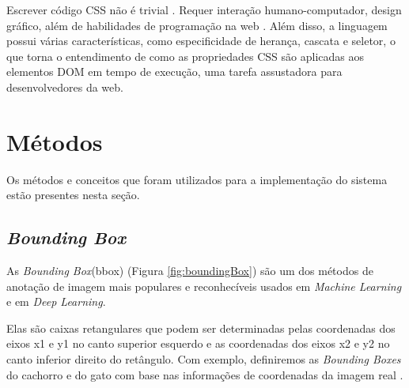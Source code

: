 Escrever código CSS não é trivial \cite{quint2007editing}. Requer interação humano-computador, design gráfico, além de habilidades de programação na web \cite{keller2010css}. Além disso, a linguagem possui várias características, como especificidade de herança, cascata e seletor, o que torna o entendimento de como as propriedades CSS são aplicadas aos elementos DOM em tempo de execução, uma tarefa assustadora para desenvolvedores da web.


\section{Métodos}

Os métodos e conceitos que foram utilizados para a implementação do sistema estão presentes nesta seção.

\subsection{\textit{Bounding Box}}

As \textit{Bounding Box}(bbox) (Figura \ref{fig:boundingBox}) são um dos métodos de anotação de imagem mais populares e reconhecíveis usados em \textit{Machine Learning} e em \textit{Deep Learning}.

Elas são caixas retangulares que podem ser determinadas pelas coordenadas dos eixos x1 e y1 no canto superior esquerdo e as coordenadas dos eixos x2 e y2 no canto inferior direito do retângulo. Com exemplo, definiremos as \textit{Bounding Boxes} do cachorro e do gato com base nas informações de coordenadas da imagem real .\cite{allDeep}

